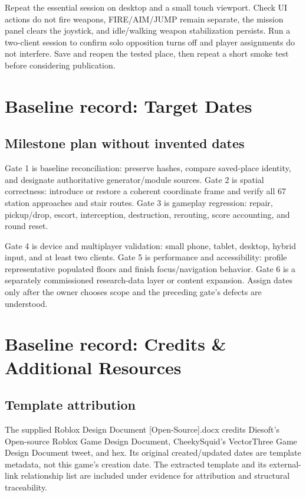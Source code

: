 Repeat the essential session on desktop and a small touch viewport.\allowbreak{} Check UI actions do not fire weapons, FIRE/\allowbreak{}AIM/\allowbreak{}JUMP remain separate, the mission panel clears the joystick, and idle/\allowbreak{}walking weapon stabilization persists.\allowbreak{} Run a two-client session to confirm solo opposition turns off and player assignments do not interfere.\allowbreak{} Save and reopen the tested place, then repeat a short smoke test before considering publication.\allowbreak{}

\chapter{Baseline record: Target Dates}
\section{Milestone plan without invented dates}
Gate 1 is baseline reconciliation: preserve hashes, compare saved-place identity, and designate authoritative generator/\allowbreak{}module sources.\allowbreak{} Gate 2 is spatial correctness: introduce or restore a coherent coordinate frame and verify all 67 station approaches and stair routes.\allowbreak{} Gate 3 is gameplay regression: repair, pickup/\allowbreak{}drop, escort, interception, destruction, rerouting, score accounting, and round reset.\allowbreak{}

Gate 4 is device and multiplayer validation: small phone, tablet, desktop, hybrid input, and at least two clients.\allowbreak{} Gate 5 is performance and accessibility: profile representative populated floors and finish focus/\allowbreak{}navigation behavior.\allowbreak{} Gate 6 is a separately commissioned research-data layer or content expansion.\allowbreak{} Assign dates only after the owner chooses scope and the preceding gate's defects are understood.\allowbreak{}

\chapter{Baseline record: Credits \& Additional Resources}
\section{Template attribution}
The supplied Roblox Design Document [Open-Source].\allowbreak{}docx credits Diesoft's Open-source Roblox Game Design Document, CheekySquid's VectorThree Game Design Document tweet, and hex.\allowbreak{} Its original created/\allowbreak{}updated dates are template metadata, not this game's creation date.\allowbreak{} The extracted template and its external-link relationship list are included under evidence for attribution and structural traceability.\allowbreak{}

